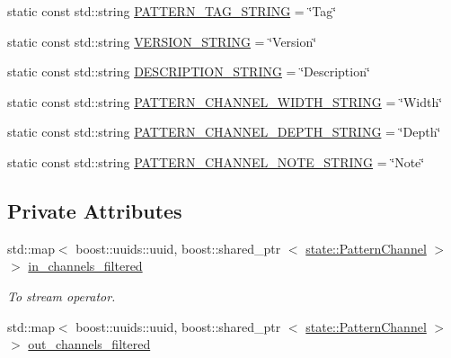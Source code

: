 \begin{DoxyCompactItemize}
\item 
static const std\-::string \hyperlink{classcryomesh_1_1utilities_1_1SequencerChannels_a57f20daf1718ac1e76bbafb1e5df6cf0}{\-P\-A\-T\-T\-E\-R\-N\-\_\-\-T\-A\-G\-\_\-\-S\-T\-R\-I\-N\-G} = \char`\"{}\-Tag\char`\"{}
\item 
static const std\-::string \hyperlink{classcryomesh_1_1utilities_1_1SequencerChannels_a8083e83370f3791b81930be9a00273c6}{\-V\-E\-R\-S\-I\-O\-N\-\_\-\-S\-T\-R\-I\-N\-G} = \char`\"{}\-Version\char`\"{}
\item 
static const std\-::string \hyperlink{classcryomesh_1_1utilities_1_1SequencerChannels_ac005d08c1b3f477558ec1ea16666d3c2}{\-D\-E\-S\-C\-R\-I\-P\-T\-I\-O\-N\-\_\-\-S\-T\-R\-I\-N\-G} = \char`\"{}\-Description\char`\"{}
\item 
static const std\-::string \hyperlink{classcryomesh_1_1utilities_1_1SequencerChannels_a225a1bbea4f6f0301c8e12e590be275b}{\-P\-A\-T\-T\-E\-R\-N\-\_\-\-C\-H\-A\-N\-N\-E\-L\-\_\-\-W\-I\-D\-T\-H\-\_\-\-S\-T\-R\-I\-N\-G} = \char`\"{}\-Width\char`\"{}
\item 
static const std\-::string \hyperlink{classcryomesh_1_1utilities_1_1SequencerChannels_a00cdeb8a6d92b863acf5c0b106dc3b86}{\-P\-A\-T\-T\-E\-R\-N\-\_\-\-C\-H\-A\-N\-N\-E\-L\-\_\-\-D\-E\-P\-T\-H\-\_\-\-S\-T\-R\-I\-N\-G} = \char`\"{}\-Depth\char`\"{}
\item 
static const std\-::string \hyperlink{classcryomesh_1_1utilities_1_1SequencerChannels_a9116cb771e1472d247d174cd3f56cbf7}{\-P\-A\-T\-T\-E\-R\-N\-\_\-\-C\-H\-A\-N\-N\-E\-L\-\_\-\-N\-O\-T\-E\-\_\-\-S\-T\-R\-I\-N\-G} = \char`\"{}\-Note\char`\"{}
\end{DoxyCompactItemize}
\subsection*{\-Private \-Attributes}
\begin{DoxyCompactItemize}
\item 
std\-::map$<$ boost\-::uuids\-::uuid, \*
boost\-::shared\-\_\-ptr\*
$<$ \hyperlink{classcryomesh_1_1state_1_1PatternChannel}{state\-::\-Pattern\-Channel} $>$ $>$ \hyperlink{classcryomesh_1_1utilities_1_1SequencerChannels_a5c846c9a395100a4dae3dfb96e0b584c}{in\-\_\-channels\-\_\-filtered}
\begin{DoxyCompactList}\small\item\em \-To stream operator. \end{DoxyCompactList}\item 
std\-::map$<$ boost\-::uuids\-::uuid, \*
boost\-::shared\-\_\-ptr\*
$<$ \hyperlink{classcryomesh_1_1state_1_1PatternChannel}{state\-::\-Pattern\-Channel} $>$ $>$ \hyperlink{classcryomesh_1_1utilities_1_1SequencerChannels_a351a6f64e6aed5cb76304f98d8a0ebd8}{out\-\_\-channels\-\_\-filtered}
\end{DoxyCompactItemize}


